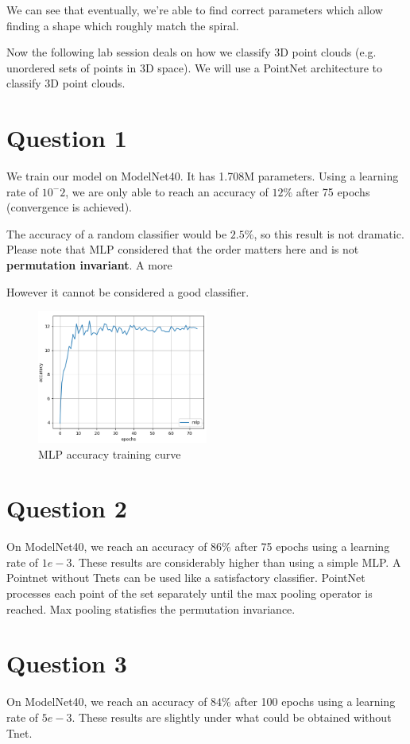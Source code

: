 \documentclass[a4paper]{article}
\begin{document}
We can see that eventually, we're able to find correct parameters which allow finding a shape which roughly match the spiral.   

Now the following lab session deals on how we classify 3D point clouds (e.g. unordered sets of points in 3D space). We will use a PointNet architecture to classify 3D point clouds.

\section*{Question 1}

We train our model on ModelNet40. It has 1.708M parameters. Using a learning rate of $10^{-}2$, we
are only able to reach an accuracy of $12\%$ after 75 epochs (convergence is achieved).

The accuracy of a random classifier would be $2.5\%$, so this result is not dramatic. Please note that MLP considered that the order matters here and is not \textbf{permutation invariant}. A more

However it cannot be considered a good classifier.

\begin{figure}[H]
    \centering
    \includegraphics[width=0.5\textwidth]{figures/Q1.png}
    \caption{MLP accuracy training curve}
    \label{fig:MLP}
\end{figure}

\section*{Question 2}
On ModelNet40, we reach an accuracy of $86\%$ after 75 epochs using a learning rate of $1e-3$.
These results are considerably higher than using a simple MLP. A Pointnet without Tnets can be used
like a satisfactory classifier.
PointNet processes each point of the set separately until the max pooling operator is reached. Max pooling statisfies the permutation invariance.


\section*{Question 3}
On ModelNet40, we reach an accuracy of $84\%$ after 100 epochs using a learning rate of $5e-3$.
These results are slightly under what could be obtained without Tnet.
\end{document}
